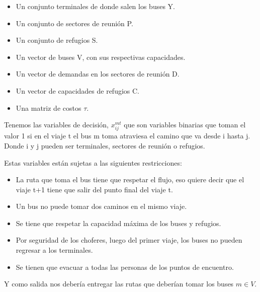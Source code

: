 \documentclass[letter, 10pt]{article}
\begin{document}
\begin{itemize}
\item Un conjunto terminales de donde salen los buses Y.
\item Un conjunto de sectores de reunión P.
\item Un conjunto de refugios S.
\item Un vector de buses V, con sus respectivas capacidades.
\item Un vector de demandas en los sectores de reunión D.
\item Un vector de capacidades de refugios C.
\item Una matriz de costos $\tau$.
\end{itemize}

Tenemos las variables de decisión, $x_{ij}^{mt}$ que son variables binarias que toman el valor 1 si en el viaje t el bus m toma atraviesa el camino que va desde i hasta j. Donde i y j pueden ser terminales, sectores de reunión o refugios.

Estas variables están sujetas a las siguientes restricciones:

\begin{itemize}
\item La ruta que toma el bus tiene que respetar el flujo, eso quiere decir que el viaje t+1 tiene que salir del punto final del viaje t.

\item Un bus no puede tomar dos caminos en el mismo viaje.

\item Se tiene que respetar la capacidad máxima de los buses y refugios.

\item Por seguridad de los choferes, luego del primer viaje,  los buses no pueden regresar a los terminales.

\item Se tienen que evacuar a todas las personas de los puntos de encuentro.


\end{itemize}

Y como salida nos debería entregar las rutas que deberían tomar los buses $m \in V$.
\end{document}
